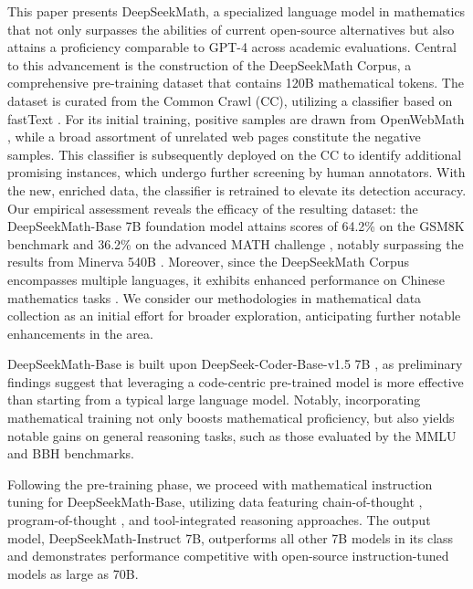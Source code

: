 This paper presents DeepSeekMath, a specialized language model in mathematics that not only surpasses the abilities of current open-source alternatives but also attains a proficiency comparable to GPT-4 across academic evaluations. Central to this advancement is the construction of the DeepSeekMath Corpus, a comprehensive pre-training dataset that contains 120B mathematical tokens. The dataset is curated from the Common Crawl (CC), utilizing a classifier based on fastText \citep{joulin2016fasttext}. For its initial training, positive samples are drawn from OpenWebMath \citep{openwebmath}, while a broad assortment of unrelated web pages constitute the negative samples. This classifier is subsequently deployed on the CC to identify additional promising instances, which undergo further screening by human annotators. With the new, enriched data, the classifier is retrained to elevate its detection accuracy. Our empirical assessment reveals the efficacy of the resulting dataset: the DeepSeekMath-Base 7B foundation model attains scores of 64.2\% on the GSM8K benchmark \citep{gsm8k} and 36.2\% on the advanced MATH challenge \citep{MATH}, notably surpassing the results from Minerva 540B \citep{minerva}. Moreover, since the DeepSeekMath Corpus encompasses multiple languages, it exhibits enhanced performance on Chinese mathematics tasks \citep{wei2023cmath,agieval}. We consider our methodologies in mathematical data collection as an initial effort for broader exploration, anticipating further notable enhancements in the area.

DeepSeekMath-Base is built upon DeepSeek-Coder-Base-v1.5 7B \citep{deepseek-coder}, as preliminary findings suggest that leveraging a code-centric pre-trained model is more effective than starting from a typical large language model. Notably, incorporating mathematical training not only boosts mathematical proficiency, but also yields notable gains on general reasoning tasks, such as those evaluated by the MMLU \citep{mmlu} and BBH \citep{bbh} benchmarks.

Following the pre-training phase, we proceed with mathematical instruction tuning for DeepSeekMath-Base, utilizing data featuring chain-of-thought \citep{cot}, program-of-thought \citep{pot,pal}, and tool-integrated reasoning \citep{tora} approaches. The output model, DeepSeekMath-Instruct 7B, outperforms all other 7B models in its class and demonstrates performance competitive with open-source instruction-tuned models as large as 70B.

